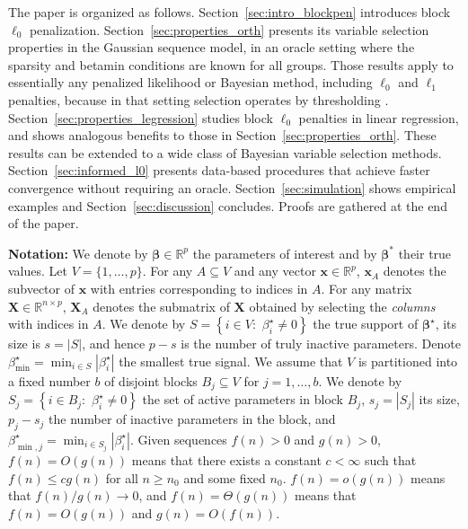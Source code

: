 \documentclass[aos]{imsart}
\theoremstyle{plain}
\newcommand{\R}{\mathbb{R}}
\newcommand{\bs}{\boldsymbol}
\begin{document}
The paper is organized as follows. Section~\ref{sec:intro_blockpen} introduces block $\ell_0$ penalization. Section~\ref{sec:properties_orth} presents its %
variable selection properties %
in the Gaussian sequence model, %
in an oracle setting where the sparsity and betamin conditions are known for all groups.
Those results apply to essentially any penalized likelihood or Bayesian method, including $\ell_0$ and $\ell_1$ penalties, because in that setting selection operates by thresholding \cite{davidomiros,rigollethighdimensional}. Section~\ref{sec:properties_legression} studies block $\ell_0$ penalties in linear regression, and shows analogous benefits to those in Section~\ref{sec:properties_orth}.
These results can be extended to a wide class of Bayesian variable selection methods. Section~\ref{sec:informed_l0} presents data-based %
procedures %
that achieve faster convergence without requiring an oracle. Section~\ref{sec:simulation} shows empirical examples and Section~\ref{sec:discussion} concludes. Proofs are gathered at the end of the paper.
\medskip

\noindent \textbf{Notation:}  
We denote by $\bs \beta\in \R^p$ the parameters of interest and by $\bs \beta^*$ their true values. Let  $V=\{1,\ldots,p\}$. 
For any $A\subseteq V$ and any vector $\bs x\in \R^p$, $\bs x_A$ denotes the subvector of $\bs x$ with entries corresponding to indices in $A$. For any matrix $\bs X \in \R^{n\times p}$, $\bs X_A$ denotes the submatrix of $\bs X$ obtained by selecting the \emph{columns} with indices in $A$. We denote by
$S=\left\{i\in V:\,\,  \beta^{\star}_i \neq 0 \right\}$ the true support of $\bs \beta^{\star}$, its size is $s=|S|$, and hence $p-s$ is the number of truly inactive parameters.
Denote $\beta_{\min}^{\star}=\min_{i \in S}|\beta^{\star}_i|$ the smallest true signal.
We assume that $V$ is partitioned into a fixed number $b$ of disjoint blocks $B_j \subseteq V$ for $j=1,\ldots,b$.
We denote by $S_j=\left\{i\in B_j:\,\,  \beta^{\star}_i \neq 0\right\}$ the set of active parameters in block $B_j$,  $s_j=|S_j|$ its size, $p_j-s_j$ the number of inactive parameters in the block,
and $\beta_{\min,j}^{\star}=\min_{i \in S_j}|\beta^{\star}_i|$.
Given sequences $f(n) > 0$ and $g(n) >0$, $f(n)=O(g(n))$ means that there exists a constant $c<\infty$ such that $f(n) \leq c g(n)$ for all $n \geq n_0$ and some fixed $n_0$.
$f(n)=o(g(n))$ means that $f(n) / g(n) \to 0$, and $f(n)=\Theta(g(n))$ means that $f(n) = O(g(n))$ and $g(n) = O(f(n))$. 
\medskip
\end{document}
